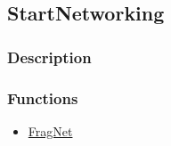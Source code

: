 \subsection{StartNetworking}\label{StartNetworking}
\subsubsection{Description}


\subsubsection{Functions}
\begin{itemize}
\item \hyperref[FragNet]{FragNet}
\end{itemize}

